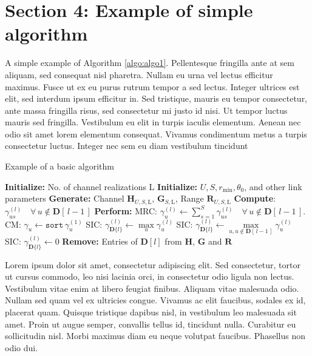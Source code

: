 \section{Section 4: Example of simple algorithm} \label{sec:sec4}
A simple example of Algorithm \ref{algo:algo1}. Pellentesque fringilla ante at sem aliquam, sed consequat nisl pharetra. Nullam eu urna vel lectus efficitur maximus. Fusce ut ex eu purus rutrum tempor a sed lectus. Integer ultrices est elit, sed interdum ipsum efficitur in. Sed tristique, mauris eu tempor consectetur, ante massa fringilla risus, sed consectetur mi justo id nisi. Ut tempor luctus mauris sed fringilla. Vestibulum eu elit in turpis iaculis elementum. Aenean nec odio sit amet lorem elementum consequat. Vivamus condimentum metus a turpis consectetur luctus. Integer nec sem eu diam vestibulum tincidunt
\begin{algorithm}
\caption{Example of a basic algorithm}\label{algo:algo1}
    \begin{algorithmic}
    \State \textbf{Initialize:} No. of channel realizations L
    \State \textbf{Initialize:} $U, S, r_{\text{min}}, \theta_0$, and other link parameters
    \State \textbf{Generate:} Channel $\mathbf{H}_{U,S,\text{L}}$, $\mathbf{G}_{S,\text{L}}$, Range $\mathbf{R}_{U,S,\text{L}}$
            \State \textbf{Compute}: $\gamma_{us}^{(l)} \quad \forall \, u \notin \mathbf{D}[\,l-1\,]$
            \State \textbf{Perform:} MRC:  $\gamma_u^{(l)} \gets \sum_{s=1}^{S} \gamma_{us}^{(l)} \quad \forall \, u \notin \mathbf{D}[\,l-1\,].$
                \State CM: $\gamma_u \gets \texttt{sort}\, \gamma_u^{(1)}$
                \State SIC: $\gamma_{\mathbf{D}\{l\}}^{(l)} \gets \max\limits_{u} \gamma_{u}^{(l)}$
                \State SIC: $\gamma_{\mathbf{D}\{l\}}^{(l)} \gets \max\limits_{u, u \notin \mathbf{D}[\,l-1\,]} \gamma_{u}^{(l)}$
            \Else
                \State SIC: $\gamma_{\mathbf{D}\{l\}}^{(l)} \gets 0$
            \EndIf
            \State \textbf{Remove:} Entries of $\mathbf{D}[l]$ from $\mathbf{H}$, $\mathbf{G}$ and $\mathbf{R}$    
        \EndFor
    \end{algorithmic}
\end{algorithm}

Lorem ipsum dolor sit amet, consectetur adipiscing elit. Sed consectetur, tortor ut cursus commodo, leo nisi lacinia orci, in consectetur odio ligula non lectus. Vestibulum vitae enim at libero feugiat finibus. Aliquam vitae malesuada odio. Nullam sed quam vel ex ultricies congue. Vivamus ac elit faucibus, sodales ex id, placerat quam. Quisque tristique dapibus nisl, in vestibulum leo malesuada sit amet. Proin ut augue semper, convallis tellus id, tincidunt nulla. Curabitur eu sollicitudin nisl. Morbi maximus diam eu neque volutpat faucibus. Phasellus non odio dui.

